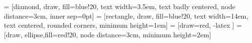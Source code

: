 
\newcommand\Wider[2][3em]{%
\makebox[\linewidth][c]{%
  \begin{minipage}{\dimexpr\textwidth+#1\relax}
  \raggedright#2
  \end{minipage}%
  }%
}


 = [diamond, draw, fill=blue!20, text width=3.5em, text badly centered, node distance=3cm, inner sep=0pt]
 = [rectangle, draw, fill=blue!20, text width=14em, text centered, rounded corners, minimum height=1em]
 = [draw=red, -latex    ]
 = [draw, ellipse,fill=red!20, node distance=3cm, minimum height=2em]


%

\newcommand{\refonslide}[3]{
\begin{tikzpicture}
\node[rectangle,minimum width=0.99\textwidth] (m) {\begin{minipage}{0.95\textwidth}\scriptsize #1 \textit{#2} #3 \end{minipage}};
\draw[violet, dashed] (m.south west) rectangle (m.north east);
\end{tikzpicture}
}

